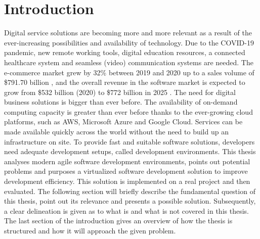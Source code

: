 
\section{Introduction}\label{sec::intro}
Digital service solutions are becoming more and more relevant as a result of the ever-increasing possibilities and availability of technology. Due to the COVID-19 pandemic, new remote working tools, digital education resources, a connected healthcare system and seamless (video) communication systems are needed. The e-commerce market grew by 32\% between 2019 and 2020 up to a sales volume of \$791.70 billion \cite{online_shopping_inc}, and the overall revenue in the software market is expected to grow from \$532 billion (2020) to \$772 billion in 2025 \cite{software_industry_groth}. The need for digital business solutions is bigger than ever before. The availability of on-demand computing capacity is greater than ever before thanks to the ever-growing cloud platforms, such as \ac{AWS}, Microsoft Azure and Google Cloud. Services can be made available quickly across the world without the need to build up an infrastructure on site. To provide fast and suitable software solutions, developers need adequate development setups, called development environments. This thesis analyses modern agile software development environments, points out potential problems and purposes a virtualized software development solution to improve development efficiency. This solution is implemented on a real project and then evaluated.\newline
The following section will briefly describe the fundamental question of this thesis, point out its relevance and presents a possible solution. Subsequently, a clear delineation is given as to what is and what is not covered in this thesis. The last section of the introduction gives an overview of how the thesis is structured and how it will approach the given problem.

